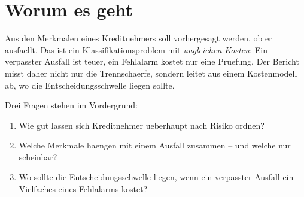 \section{Worum es geht}

Aus den Merkmalen eines Kreditnehmers soll vorhergesagt werden, ob er
ausfaellt. Das ist ein Klassifikationsproblem mit \emph{ungleichen Kosten}:
Ein verpasster Ausfall ist teuer, ein Fehlalarm kostet nur eine Pruefung.
Der Bericht misst daher nicht nur die Trennschaerfe, sondern leitet aus einem
Kostenmodell ab, wo die Entscheidungsschwelle liegen sollte.

Drei Fragen stehen im Vordergrund:

\begin{enumerate}
  \item Wie gut lassen sich Kreditnehmer ueberhaupt nach Risiko ordnen?
  \item Welche Merkmale haengen mit einem Ausfall zusammen -- und welche
        nur scheinbar?
  \item Wo sollte die Entscheidungsschwelle liegen, wenn ein verpasster
        Ausfall ein Vielfaches eines Fehlalarms kostet?
\end{enumerate}
